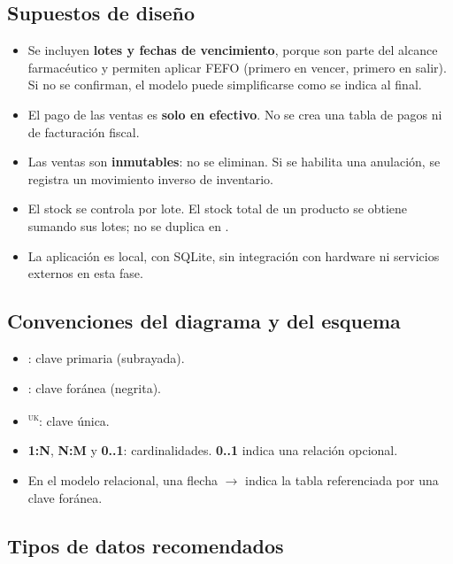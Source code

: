 \documentclass[10pt,a4paper,landscape]{article}
\newcommand{\code}[1]{\texttt{\detokenize{#1}}}
\newcommand{\pk}[1]{\underline{\code{#1}}}
\newcommand{\fk}[1]{\textbf{\code{#1}}}
\newcommand{\uk}{\textsuperscript{\textsc{uk}}}
\begin{document}
\subsection*{Supuestos de diseño}

\begin{itemize}[leftmargin=*, itemsep=2pt]
  \item Se incluyen \textbf{lotes y fechas de vencimiento}, porque son parte del alcance farmacéutico y permiten aplicar FEFO (primero en vencer, primero en salir). Si no se confirman, el modelo puede simplificarse como se indica al final.
  \item El pago de las ventas es \textbf{solo en efectivo}. No se crea una tabla de pagos ni de facturación fiscal.
  \item Las ventas son \textbf{inmutables}: no se eliminan. Si se habilita una anulación, se registra un movimiento inverso de inventario.
  \item El stock se controla por lote. El stock total de un producto se obtiene sumando sus lotes; no se duplica en \code{Producto}.
  \item La aplicación es local, con SQLite, sin integración con hardware ni servicios externos en esta fase.
\end{itemize}

\subsection*{Convenciones del diagrama y del esquema}

\begin{itemize}[leftmargin=*, itemsep=2pt]
  \item \pk{id}: clave primaria (subrayada).
  \item \fk{campo}: clave foránea (negrita).
  \item \uk: clave única.
  \item \textbf{1:N}, \textbf{N:M} y \textbf{0..1}: cardinalidades. \textbf{0..1} indica una relación opcional.
  \item En el modelo relacional, una flecha $\rightarrow$ indica la tabla referenciada por una clave foránea.
\end{itemize}

\subsection*{Tipos de datos recomendados}
\end{document}
